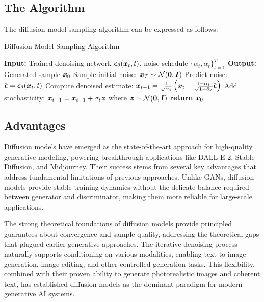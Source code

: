 \subsection{The Algorithm}

The diffusion model sampling algorithm can be expressed as follows:

\begin{algorithm}[h]
\caption{Diffusion Model Sampling Algorithm}
\begin{algorithmic}[1]
\State \textbf{Input:} Trained denoising network $\boldsymbol{\epsilon}_{\theta}(\boldsymbol{x}_t, t)$, noise schedule $\{\alpha_t, \bar{\alpha}_t\}_{t=1}^T$
\State \textbf{Output:} Generated sample $\boldsymbol{x}_0$
\State
\State Sample initial noise: $\boldsymbol{x}_T \sim \mathcal{N}(\boldsymbol{0}, \boldsymbol{I})$
    \State Predict noise: $\hat{\boldsymbol{\epsilon}} = \boldsymbol{\epsilon}_{\theta}(\boldsymbol{x}_t, t)$
    \State Compute denoised estimate: $\boldsymbol{x}_{t-1} = \frac{1}{\sqrt{\alpha_t}}\left(\boldsymbol{x}_t - \frac{1-\alpha_t}{\sqrt{1-\bar{\alpha}_t}}\hat{\boldsymbol{\epsilon}}\right)$
        \State Add stochasticity: $\boldsymbol{x}_{t-1} = \boldsymbol{x}_{t-1} + \sigma_t \boldsymbol{z}$ where $\boldsymbol{z} \sim \mathcal{N}(\boldsymbol{0}, \boldsymbol{I})$
    \EndIf
\EndFor
\State \textbf{return} $\boldsymbol{x}_0$
\end{algorithmic}
\end{algorithm}

\subsection{Advantages}

Diffusion models have emerged as the state-of-the-art approach for high-quality generative modeling, powering breakthrough applications like DALL-E 2, Stable Diffusion, and Midjourney. Their success stems from several key advantages that address fundamental limitations of previous approaches. Unlike GANs, diffusion models provide stable training dynamics without the delicate balance required between generator and discriminator, making them more reliable for large-scale applications.

The strong theoretical foundations of diffusion models provide principled guarantees about convergence and sample quality, addressing the theoretical gaps that plagued earlier generative approaches. The iterative denoising process naturally supports conditioning on various modalities, enabling text-to-image generation, image editing, and other controlled generation tasks. This flexibility, combined with their proven ability to generate photorealistic images and coherent text, has established diffusion models as the dominant paradigm for modern generative AI systems.

